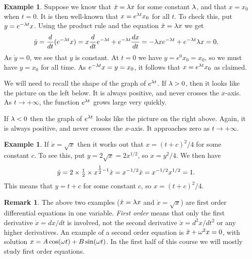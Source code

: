 \documentclass[reqno]{amsart}
\theoremstyle{definition}
\newtheorem{remark}[theorem]{Remark}
\newtheorem{example}[theorem]{Example}
\begin{document}
\begin{example}
 Suppose we know that $\dot{x}=\lambda x$ for some constant $\lambda$, and
 that $x=x_0$ when $t=0$.  It is then well-known that
 $x=e^{\lambda t}x_0$ for all $t$.  To check this, put $y=e^{-\lambda t}x$.
 Using the product rule and the equation $\dot{x}=\lambda x$ we get
 \[ \dot{y}=\frac{d}{dt}(e^{-\lambda t}x) = 
     x \frac{d}{dt} e^{-\lambda t} + e^{-\lambda t} \frac{dx}{dt} = 
     -\lambda x e^{-\lambda t} + e^{-\lambda t}\lambda x = 0.
 \]
 As $\dot{y}=0$, we see that $y$ is constant.  At $t=0$ we have
 $y=e^0x_0=x_0$, so we must have $y=x_0$ for all time.  As
 $e^{-\lambda t}x=y=x_0$, it follows that $x=e^{\lambda t}x_0$ as claimed.

 We will need to recall the shape of the graph of $e^{\lambda t}$.  If
 $\lambda>0$, then it looks like the picture on the left below. It is
 always positive, and never crosses the $x$-axis.  As
 $t\to +\infty$, the function $e^{\lambda t}$ grows large very quickly.
 \begin{center}
 \end{center}
 If $\lambda<0$ then the graph of $e^{\lambda t}$ looks like the picture on
 the right above.  Again, it is always positive, and never crosses the
 $x$-axis.  It approaches zero as $t\to +\infty$.
\end{example}

\begin{example}
 If $\dot{x}=\sqrt{x}$ then it works out that $x=(t+c)^2/4$ for some
 constant $c$.  To see this, put $y=2\sqrt{x}=2x^{1/2}$, so $x=y^2/4$.
 We then have 
 \[ \dot{y} = 2 \times \tfrac{1}{2} \times x^{\tfrac{1}{2} - 1} \dot{x}
     = x^{-1/2} \dot{x} = x^{-1/2} x^{1/2} = 1.
 \]
 This means that $y=t+c$ for some constant $c$, so $x=(t+c)^2/4$.
\end{example}

\begin{remark}
 The above two examples ($\dot{x}=\lambda x$ and $\dot{x}=\sqrt{x}$) are
 first order differential equations in one variable.  \emph{First
  order} means that only the first derivative $\dot{x}=dx/dt$ is
 involved, not the second derivative $\ddot{x}=d^2x/dt^2$ or any
 higher derivatives.  An example of a second order equation is
 $\ddot{x}+\omega^2x=0$, with solution $x=A\cos(\omega t)+B\sin(\omega t)$.  In
 the first half of this course we will mostly study first order
 equations.  
\end{remark}
\end{document}
